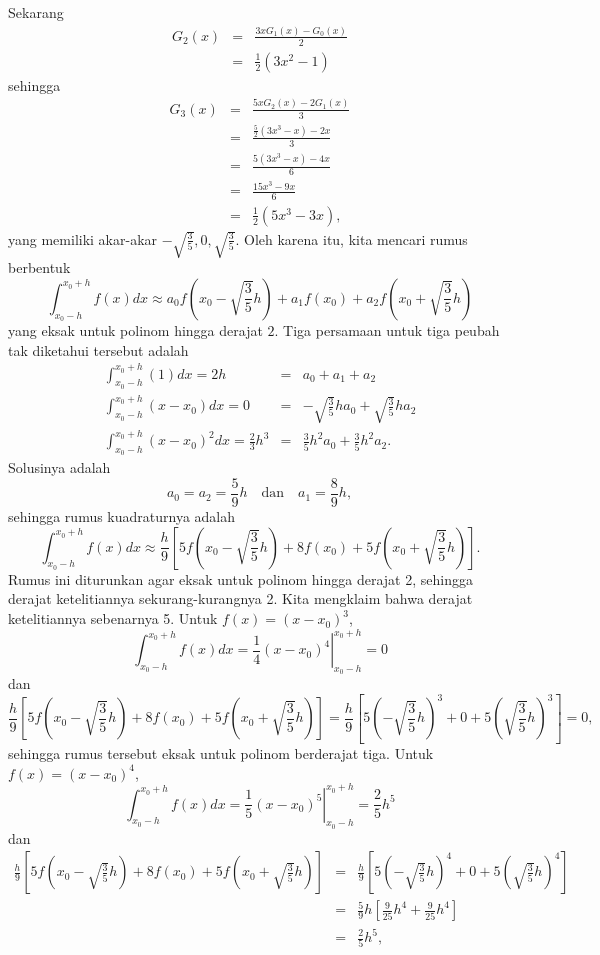 Sekarang
\begin{eqnarray*}
G_{2}(x) & = & \frac{3xG_{1}(x)-G_{0}(x)}{2}\\
 & = & \frac{1}{2}(3x^{2}-1)
\end{eqnarray*}
 sehingga
\begin{eqnarray*}
G_{3}(x) & = & \frac{5xG_{2}(x)-2G_{1}(x)}{3}\\
 & = & \frac{\frac{5}{2}(3x^{3}-x)-2x}{3}\\
 & = & \frac{5(3x^{3}-x)-4x}{6}\\
 & = & \frac{15x^{3}-9x}{6}\\
 & = & \frac{1}{2}(5x^{3}-3x),
\end{eqnarray*}
yang memiliki akar-akar $-\sqrt{\frac{3}{5}},0,\sqrt{\frac{3}{5}}$.
Oleh karena itu, kita mencari rumus berbentuk 
\[
\int_{x_{0}-h}^{x_{0}+h}f(x)dx\approx a_{0}f\left(x_{0}-\sqrt{\frac{3}{5}}h\right)+a_{1}f(x_{0})+a_{2}f\left(x_{0}+\sqrt{\frac{3}{5}}h\right)
\]
yang eksak untuk polinom hingga derajat $2$. Tiga persamaan untuk
tiga peubah tak diketahui tersebut adalah
\begin{eqnarray*}
\int_{x_{0}-h}^{x_{0}+h}(1)dx=2h & = & a_{0}+a_{1}+a_{2}\\
\int_{x_{0}-h}^{x_{0}+h}(x-x_{0})dx=0 & = & -\sqrt{\frac{3}{5}}ha_{0}+\sqrt{\frac{3}{5}}ha_{2}\\
\int_{x_{0}-h}^{x_{0}+h}(x-x_{0})^{2}dx=\frac{2}{3}h^{3} & = & \frac{3}{5}h^{2}a_{0}+\frac{3}{5}h^{2}a_{2}.
\end{eqnarray*}
Solusinya adalah 
\[
a_{0}=a_{2}=\frac{5}{9}h\quad\mbox{dan}\quad a_{1}=\frac{8}{9}h,
\]
sehingga rumus kuadraturnya adalah
\[
\int_{x_{0}-h}^{x_{0}+h}f(x)dx\approx\frac{h}{9}\left[5f\left(x_{0}-\sqrt{\frac{3}{5}}h\right)+8f(x_{0})+5f\left(x_{0}+\sqrt{\frac{3}{5}}h\right)\right].
\]
Rumus ini diturunkan agar eksak untuk polinom hingga derajat 2, sehingga
derajat ketelitiannya sekurang-kurangnya 2. Kita mengklaim bahwa derajat
ketelitiannya sebenarnya 5. Untuk $f(x)=(x-x_{0})^{3}$, 
\[
\int_{x_{0}-h}^{x_{0}+h}f(x)dx=\left.\frac{1}{4}(x-x_{0})^{4}\right|_{x_{0}-h}^{x_{0}+h}=0
\]
 dan
\[
\frac{h}{9}\left[5f\left(x_{0}-\sqrt{\frac{3}{5}}h\right)+8f(x_{0})+5f\left(x_{0}+\sqrt{\frac{3}{5}}h\right)\right]=\frac{h}{9}\left[5\left(-\sqrt{\frac{3}{5}}h\right)^{3}+0+5\left(\sqrt{\frac{3}{5}}h\right)^{3}\right]=0,
\]
sehingga rumus tersebut eksak untuk polinom berderajat tiga. Untuk
$f(x)=(x-x_{0})^{4}$, 
\[
\int_{x_{0}-h}^{x_{0}+h}f(x)dx=\left.\frac{1}{5}(x-x_{0})^{5}\right|_{x_{0}-h}^{x_{0}+h}=\frac{2}{5}h^{5}
\]
 dan
\begin{eqnarray*}
\frac{h}{9}\left[5f\left(x_{0}-\sqrt{\frac{3}{5}}h\right)+8f(x_{0})+5f\left(x_{0}+\sqrt{\frac{3}{5}}h\right)\right] & = & \frac{h}{9}\left[5\left(-\sqrt{\frac{3}{5}}h\right)^{4}+0+5\left(\sqrt{\frac{3}{5}}h\right)^{4}\right]\\
 & = & \frac{5}{9}h\left[\frac{9}{25}h^{4}+\frac{9}{25}h^{4}\right]\\
 & = & \frac{2}{5}h^{5},
\end{eqnarray*}

